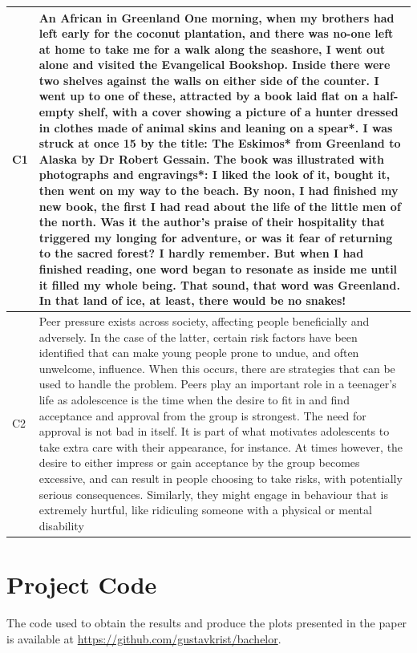 \documentclass[11pt,a4paper]{article}
\begin{document}
\begin{longtable}{l|p{}}
  \midrule
  C1 & An African in Greenland \newline
  One morning, when my brothers had left early for the coconut plantation, and
  there was no-one left at home to take me for a walk along the seashore, I went
  out alone and visited the Evangelical Bookshop. Inside there were two shelves
  against the walls on either side of the counter. I went up to one of these,
  attracted by a book laid flat on a half-empty shelf, with a cover showing a
  picture of a hunter dressed in clothes made of animal skins and leaning on a
  spear*. I was struck at once 15 by the title: The Eskimos* from Greenland to
  Alaska by Dr Robert Gessain. The book was illustrated with photographs and
  engravings*: I liked the look of it, bought it, then went on my way to the
  beach. By noon, I had finished my new book, the first I had read about the life
  of the little men of the north. Was it the author's praise of their hospitality
  that triggered my longing for adventure, or was it fear of returning to the
  sacred forest? I hardly remember. But when I had finished reading, one word
  began to resonate as inside me until it filled my whole being. That sound, that
  word was Greenland. In that land of ice, at least, there would be no snakes!\\
  \midrule
  C2 & Peer pressure exists across society, affecting people beneficially and adversely.
  In the case of the latter, certain risk factors have been identified that can make
  young people prone to undue, and often unwelcome, influence. When this occurs,
  there are strategies that can be used to handle the problem.
  Peers play an important role in a teenager's life as adolescence is the time
  when the desire to fit in and find acceptance and approval from the group is
  strongest. The need for approval is not bad in itself. It is part of what
  motivates adolescents to take extra care with their appearance, for instance.
  At times however, the desire to either impress or gain acceptance by the group
  becomes excessive, and can result in people choosing to take risks, with
  potentially serious consequences. Similarly, they might engage in behaviour
  that is extremely hurtful, like ridiculing someone with a physical or mental
  disability\\
  \bottomrule
\end{longtable}

\section{Project Code}

The code used to obtain the results and produce the plots presented in the paper is available at
\url{https://github.com/gustavkrist/bachelor}.
\end{document}
